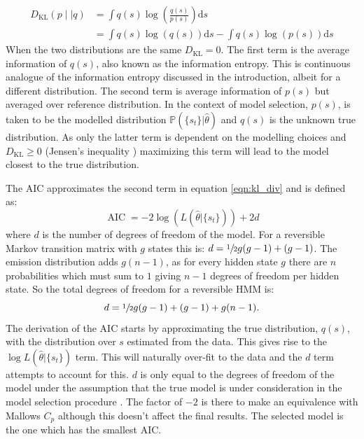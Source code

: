 \begin{equation}\label{eqn:kl_div}
\begin{split}
    D_{\mathrm{KL}}\left(p\mid | q\right) & = \int q(s) \log{\left(\frac{ q(s) }{p(s)}  \right)} \mathrm{d}s \\ 
    & = \int q(s) \log{\left(q(s)\right)}\mathrm{d}s - \int q(s)\log{\left(p(s)\right)} \mathrm{d}s
\end{split}
\end{equation}
When the two distributions are the same $D_{\mathrm{KL}} = 0$. The first term is the average information of $q(s)$, also known as the information entropy. \cite{mackay2003information} This is continuous analogue of the information entropy discussed in the introduction, albeit for a different distribution. The second term is average information of $p(s)$ but averaged over reference distribution.\cite{mackay2003information} In the context of model selection, $p(s)$, is taken to be the modelled distribution $\mathbb{P}(\{s_t\}|\hat{\theta})$ and $q(s)$ is the unknown true distribution. As only the latter term is dependent on the modelling choices and  $D_{\mathrm{KL}} \ge 0$ (Jensen's inequality \cite{mackay2003information}) maximizing this term will lead to the model closest to the true distribution.  

The AIC approximates the second term in equation \ref{eqn:kl_div} and is defined as: \cite{akaikeInformationTheoryExtension1998}
\begin{equation}\label{eqn:aic}
    \operatorname{AIC} = -2\log{\left(L\left(\hat{\theta}|\{s_t\}\right)\right)} + 2d
\end{equation}
where $d$ is the number of degrees of freedom of the model. For a reversible Markov transition matrix with $g$ states this is: $d = \sfrac{1}{2}g(g-1) + (g-1)$. \cite{trendelkamp-schroerEstimationUncertaintyReversible2015b} The emission distribution adds $g(n-1)$, as for every hidden state $g$ there are $n$ probabilities which must sum to $1$ giving $n-1$ degrees of freedom per hidden state. So the total degrees of freedom for a reversible HMM is:
\begin{equation}\label{eqn:hmm_dof}
    d = \sfrac{1}{2}g(g-1) + (g-1) + g(n-1). 
\end{equation}
The derivation of the AIC starts by approximating the true distribution, $q(s)$, with the distribution over $s$ estimated from the data. This gives rise to the $\log{L\left(\hat{\theta}|\{s_t\} \right)}$ term.\cite{mclachlanFiniteMixtureModels2000}  This will naturally over-fit to the data and the $d$ term attempts to account for this. $d$ is only equal to the degrees of freedom of the model under the assumption that the true model is under consideration in the model selection procedure \cite{ripley_1996}.  The factor of $-2$ is there to make an equivalence with Mallows $C_p$ \cite{friedman2001elements} although this doesn't affect the final results. The selected model is the one which has the smallest AIC. 

